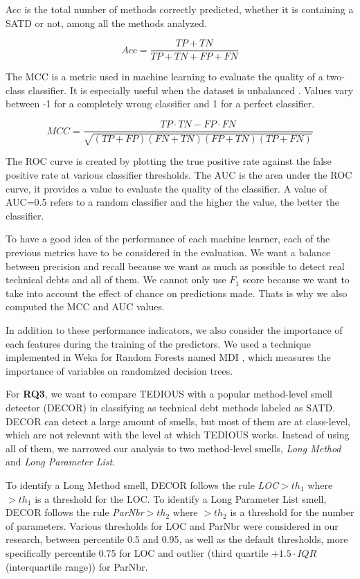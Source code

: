 \ac{Acc} is the total number of methods correctly predicted, whether it is containing a \ac{SATD} or not, among all the methods analyzed.

\[
Acc=\frac{TP+TN}{TP+TN+FP+FN}
\]

The \ac{MCC} is a metric used in machine learning to evaluate the quality of a two-class classifier. It is especially useful when the dataset is unbalanced \citep{matthews1975comparison}. Values vary between -1 for a completely wrong classifier and 1 for a perfect classifier. 

\[
MCC=\frac{TP \cdot TN-FP \cdot FN}{\sqrt{(TP+FP)(FN+TN)(FP+TN)(TP+FN)}}
\]

The \ac{ROC} curve is created by plotting the true positive rate against the false positive rate at various classifier thresholds. The \ac{AUC} is the area under the ROC curve, it provides a value to evaluate the quality of the classifier. A value of AUC=0.5 refers to a random classifier and the higher the value, the better the classifier.

To have a good idea of the performance of each machine learner, each of the previous metrics have to be considered in the evaluation. We want a balance between precision and recall because we want as much as possible to detect real technical debts and all of them. We cannot only use $F_{1}$ score because we want to take into account the effect of chance on predictions made. Thats is why we also computed the MCC and AUC values.

In addition to these performance indicators, we also consider the importance of each features during the training of the predictors. We used a technique implemented in Weka for Random Forests named \ac{MDI} \citep{louppe2013understanding}, which measures the importance of variables on randomized decision trees.

For \textbf{RQ3}, we want to compare \ac{TEDIOUS} with a popular method-level smell detector (DECOR) \citep{moha2010decor} in classifying as technical debt methods labeled as \ac{SATD}. DECOR can detect a large amount of smells, but most of them are at class-level, which are not relevant with the level at which \ac{TEDIOUS} works. Instead of using all of them, we narrowed our analysis to two method-level smells, \textit{Long Method} and \textit{Long Parameter List}. 

To identify a Long Method smell, DECOR follows the rule {\em LOC}$>th_1$ where $>th_1$ is a threshold for the LOC. To identify a Long Parameter List smell, DECOR follows the rule {\em ParNbr}$>th_2$ where $>th_2$ is a threshold for the number of parameters. Various thresholds for LOC and ParNbr were considered in our research, between percentile 0.5 and 0.95, as well as the default thresholds, more specifically percentile 0.75 for LOC and outlier (third quartile $+ 1.5 \cdot IQR$ (interquartile range)) for ParNbr.

